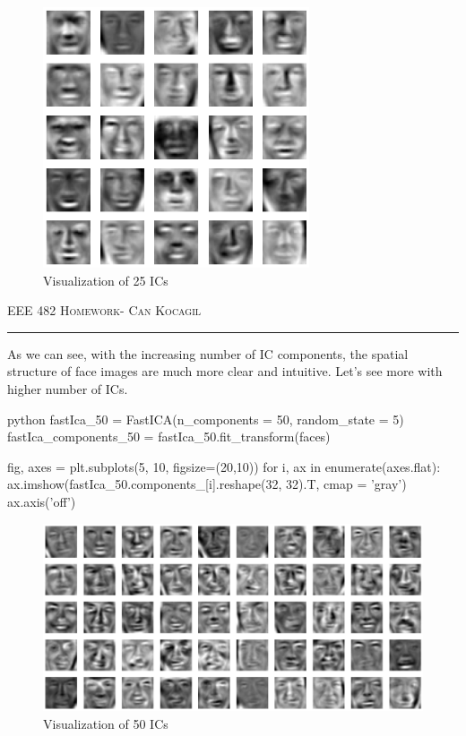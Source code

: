 \documentclass[12pt]{amsart}
\begin{document}
\begin{figure}[h]
    \centering
        \includegraphics[width = 0.7\textwidth]{images/Q1/fastICA_25_components.png}
        \caption{Visualization of 25 ICs}
\end{figure}

\newpage
{\scshape EEE 482} \hfill {\scshape \large  Homework-\relax} \hfill {\scshape Can Kocagil}
\smallskip
\hrule
\vspace{2mm}

As we can see, with the increasing number of IC components, the spatial structure of face images are much more clear and intuitive. Let's see more with higher number of ICs.


\begin{mintedbox}{python}
fastIca_50 = FastICA(n_components = 50, random_state = 5)
fastIca_components_50 = fastIca_50.fit_transform(faces)


fig, axes = plt.subplots(5, 10, figsize=(20,10))
for i, ax in enumerate(axes.flat):
    ax.imshow(fastIca_50.components_[i].reshape(32, 32).T, cmap = 'gray')
    ax.axis('off')
\end{mintedbox}

\begin{figure}[h]
    \centering
        \includegraphics[width = 1\textwidth]{images/Q1/fastICA_50_components.png}
        \caption{Visualization of 50 ICs}
\end{figure}
\end{document}
